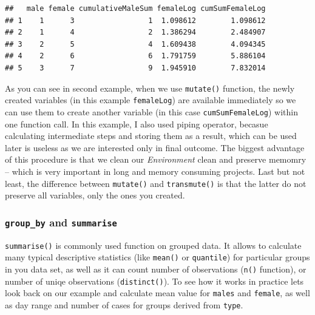 \documentclass[]{book}
\newenvironment{Shaded}{\begin{snugshade}}{\end{snugshade}}
\newcommand{\KeywordTok}[1]{\textcolor[rgb]{0.12,0.11,0.11}{\textbf{#1}}}
\newcommand{\DataTypeTok}[1]{\textcolor[rgb]{0.00,0.34,0.68}{#1}}
\newcommand{\DecValTok}[1]{\textcolor[rgb]{0.69,0.50,0.00}{#1}}
\newcommand{\StringTok}[1]{\textcolor[rgb]{0.75,0.01,0.01}{#1}}
\newcommand{\OperatorTok}[1]{\textcolor[rgb]{0.12,0.11,0.11}{#1}}
\newcommand{\NormalTok}[1]{\textcolor[rgb]{0.12,0.11,0.11}{#1}}
\theoremstyle{definition}
\theoremstyle{definition}
\theoremstyle{definition}
\theoremstyle{remark}
\begin{document}
\begin{verbatim}
##   male female cumulativeMaleSum femaleLog cumSumFemaleLog
## 1    1      3                 1  1.098612        1.098612
## 2    1      4                 2  1.386294        2.484907
## 3    2      5                 4  1.609438        4.094345
## 4    2      6                 6  1.791759        5.886104
## 5    3      7                 9  1.945910        7.832014
\end{verbatim}

As you can see in second example, when we use \texttt{mutate()}
function, the newly created variables (in this example
\texttt{femaleLog}) are available immediately so we can use them to
create another variable (in this case \texttt{cumSumFemaleLog}) within
one function call. In this example, I also used piping operator, becasue
calculating intermediate steps and storing them as a result, which can
be used later is useless as we are interested only in final outcome. The
biggest advantage of this procedure is that we clean our
\emph{Environment} clean and preserve memomry -- which is very important
in long and memory consuming projects. Last but not least, the
difference between \texttt{mutate()} and \texttt{transmute()} is that
the latter do not preserve all variables, only the ones you created.

\subsubsection{\texorpdfstring{\texttt{group\_by} and
\texttt{summarise}}{group\_by and summarise}}\label{group_by-and-summarise}

\texttt{summarise()} is commonly used function on grouped data. It
allows to calculate many typical descriptive statistics (like
\texttt{mean()} or \texttt{quantile}) for particular groups in you data
set, as well as it can count number of observations (\texttt{n()}
function), or number of uniqe observations (\texttt{distinct()}). To see
how it works in practice lets look back on our example and calculate
mean value for \texttt{males} and \texttt{female}, as well as day range
and number of cases for groups derived from \texttt{type}.

\begin{Shaded}
\end{Shaded}
\end{document}
